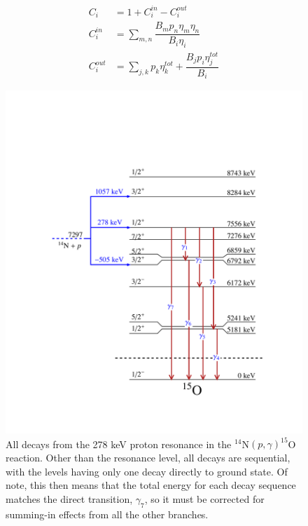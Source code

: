 \begin{align}
C_{i} &= 1 + C_{i}^{in} - C_{i}^{out} \\
C_{i}^{in} &= \sum_{m,n} \dfrac{B_{m} p_{n} \eta_{m} \eta_{n}}{B_{i} \eta_{i}} \\
C_{i}^{out} &= \sum_{j,k} p_{k} \eta_{k}^{tot} + \dfrac{B_{j} p_{i} \eta_{j}^{tot}}{B_{i}}
\end{align}




\begin{figure}
\hspace{-2cm}
\includegraphics[width=1.0\linewidth]{figures/summingOxygenDecays.pdf}
\caption[All decays from the 278 keV proton resonance in the $^{14}$N$\left( p,\gamma \right) ^{15}$O reaction. Other than the resonance level, all decays are sequential, with the levels having only one decay directly to ground state. Of note, this then means that the total energy for each decay sequence matches the direct transition, $\gamma_{7}$, so it must be corrected for summing-in effects from all the other branches.]
{{\small All decays from the 278 keV proton resonance in the $^{14}$N$\left( p,\gamma \right) ^{15}$O reaction. Other than the resonance level, all decays are sequential, with the levels having only one decay directly to ground state. Of note, this then means that the total energy for each decay sequence matches the direct transition, $\gamma_{7}$, so it must be corrected for summing-in effects from all the other branches. }}
\label{fig: summingOxygen}
\end{figure}

